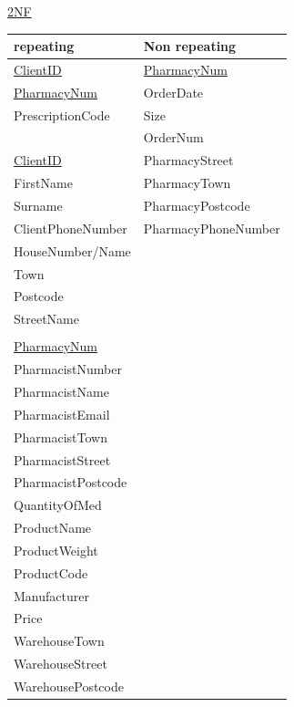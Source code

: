 \underline{2NF}
\begin{table}[H]
\begin{tabular}{|l|l|}
\hline
\textbf{repeating} & \textbf{Non repeating}\\
\hline
\underline{\underline{ClientID}}     &\underline{PharmacyNum} \\\hline
\underline{\underline{PharmacyNum}}  & OrderDate \\\hline
PrescriptionCode                     & Size\\\hline
                                     & OrderNum\\\hline
\underline{ClientID}                 & PharmacyStreet\\\hline
FirstName                            & PharmacyTown\\\hline
Surname                              & PharmacyPostcode\\\hline
ClientPhoneNumber                    & PharmacyPhoneNumber \\\hline
HouseNumber/Name         & \\\hline
Town                     & \\\hline
Postcode                 & \\\hline
StreetName               & \\\hline
 & \\\hline
\underline{PharmacyNum}  &\\\hline
PharmacistNumber         &\\\hline
PharmacistName           &\\\hline
PharmacistEmail          &\\\hline
PharmacistTown           &\\\hline
PharmacistStreet         &\\\hline
PharmacistPostcode       &\\\hline
QuantityOfMed            &\\\hline
ProductName       & \\\hline
ProductWeight     & \\\hline
ProductCode       & \\\hline
Manufacturer      & \\\hline
Price             & \\\hline
WarehouseTown &\\\hline
WarehouseStreet &\\\hline
WarehousePostcode&\\\hline
\end{tabular}
\end{table}

